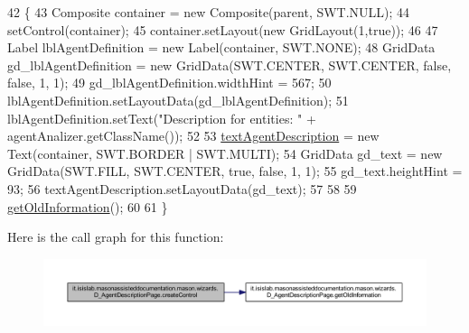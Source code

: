 \begin{DoxyCode}
42                                                 \{
43         Composite container = \textcolor{keyword}{new} Composite(parent, SWT.NULL);
44         setControl(container);
45         container.setLayout(\textcolor{keyword}{new} GridLayout(1,\textcolor{keyword}{true}));
46         
47         Label lblAgentDefinition = \textcolor{keyword}{new} Label(container, SWT.NONE);
48         GridData gd\_lblAgentDefinition = \textcolor{keyword}{new} GridData(SWT.CENTER, SWT.CENTER, \textcolor{keyword}{false}, \textcolor{keyword}{false}, 1, 1);
49         gd\_lblAgentDefinition.widthHint = 567;
50         lblAgentDefinition.setLayoutData(gd\_lblAgentDefinition);
51         lblAgentDefinition.setText(\textcolor{stringliteral}{"Description for entities: "} + agentAnalizer.getClassName());
52 
53         \hyperlink{classit_1_1isislab_1_1masonassisteddocumentation_1_1mason_1_1wizards_1_1_d___agent_description_page_a36dfef5219d3c9d56facf7345020ee82}{textAgentDescription} = \textcolor{keyword}{new} Text(container, SWT.BORDER | SWT.MULTI);
54         GridData gd\_text = \textcolor{keyword}{new} GridData(SWT.FILL, SWT.CENTER, \textcolor{keyword}{true}, \textcolor{keyword}{false}, 1, 1);
55         gd\_text.heightHint = 93;
56         textAgentDescription.setLayoutData(gd\_text);
57 
58         
59         \hyperlink{classit_1_1isislab_1_1masonassisteddocumentation_1_1mason_1_1wizards_1_1_d___agent_description_page_a0a7d91afd5148a932706e2b5c5a97b9f}{getOldInformation}();
60         
61     \}
\end{DoxyCode}


Here is the call graph for this function\-:\nopagebreak
\begin{figure}[H]
\begin{center}
\leavevmode
\includegraphics[width=350pt]{classit_1_1isislab_1_1masonassisteddocumentation_1_1mason_1_1wizards_1_1_d___agent_description_page_aff878d7cd601edf044658e6a06b389db_cgraph}
\end{center}
\end{figure}


